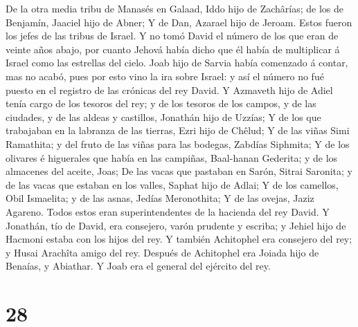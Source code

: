 De la otra media tribu de Manasés en Galaad, Iddo hijo
de Zachârías; de los de Benjamín, Jaaciel hijo de Abner; 
Y de Dan, Azarael hijo de Jeroam. Estos fueron los jefes de las tribus
de Israel.  Y no tomó David el número de los que eran de
veinte años abajo, por cuanto Jehová había dicho que él había de
multiplicar á Israel como las estrellas del cielo.  Joab
hijo de Sarvia había comenzado á contar, mas no acabó, pues por esto
vino la ira sobre Israel: y así el número no fué puesto en el registro
de las crónicas del rey David.  Y Azmaveth hijo de Adiel
tenía cargo de los tesoros del rey; y de los tesoros de los campos, y de
las ciudades, y de las aldeas y castillos, Jonathán hijo de Uzzías;
 Y de los que trabajaban en la labranza de las tierras,
Ezri hijo de Chêlud;  Y de las viñas Simi Ramathita; y
del fruto de las viñas para las bodegas, Zabdías Siphmita;
 Y de los olivares é higuerales que había en las
campiñas, Baal-hanan Gederita; y de los almacenes del aceite, Joas;
 De las vacas que pastaban en Sarón, Sitrai Saronita; y
de las vacas que estaban en los valles, Saphat hijo de Adlai;
 Y de los camellos, Obil Ismaelita; y de las asnas,
Jedías Meronothita;  Y de las ovejas, Jaziz Agareno.
Todos estos eran superintendentes de la hacienda del rey David.
 Y Jonathán, tío de David, era consejero, varón prudente
y escriba; y Jehiel hijo de Hacmoni estaba con los hijos del rey.
 Y también Achitophel era consejero del rey; y Husai
Arachîta amigo del rey.  Después de Achitophel era Joiada
hijo de Benaías, y Abiathar. Y Joab era el general del ejército del rey.

\hypertarget{section-27}{%
\section{28}\label{section-27}}

